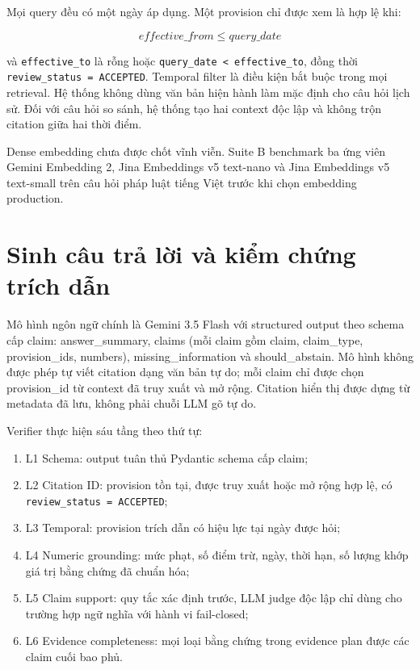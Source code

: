 \documentclass[12pt,a4paper]{article}
\begin{document}
Mọi query đều có một ngày áp dụng. Một provision chỉ được xem là hợp lệ khi:

\[
effective\_from \leq query\_date
\]

và \texttt{effective\_to} là rỗng hoặc \texttt{query\_date < effective\_to}, đồng thời \texttt{review\_status = ACCEPTED}. Temporal filter là điều kiện bắt buộc trong mọi retrieval. Hệ thống không dùng văn bản hiện hành làm mặc định cho câu hỏi lịch sử. Đối với câu hỏi so sánh, hệ thống tạo hai context độc lập và không trộn citation giữa hai thời điểm.

Dense embedding chưa được chốt vĩnh viễn. Suite B benchmark ba ứng viên Gemini Embedding 2, Jina Embeddings v5 text-nano và Jina Embeddings v5 text-small trên câu hỏi pháp luật tiếng Việt trước khi chọn embedding production.

\section{Sinh câu trả lời và kiểm chứng trích dẫn}

Mô hình ngôn ngữ chính là Gemini 3.5 Flash với structured output theo schema cấp claim: answer\_summary, claims (mỗi claim gồm claim, claim\_type, provision\_ids, numbers), missing\_information và should\_abstain. Mô hình không được phép tự viết citation dạng văn bản tự do; mỗi claim chỉ được chọn provision\_id từ context đã truy xuất và mở rộng. Citation hiển thị được dựng từ metadata đã lưu, không phải chuỗi LLM gõ tự do.

Verifier thực hiện sáu tầng theo thứ tự:

\begin{enumerate}
  \item L1 Schema: output tuân thủ Pydantic schema cấp claim;
  \item L2 Citation ID: provision tồn tại, được truy xuất hoặc mở rộng hợp lệ, có \texttt{review\_status = ACCEPTED};
  \item L3 Temporal: provision trích dẫn có hiệu lực tại ngày được hỏi;
  \item L4 Numeric grounding: mức phạt, số điểm trừ, ngày, thời hạn, số lượng khớp giá trị bằng chứng đã chuẩn hóa;
  \item L5 Claim support: quy tắc xác định trước, LLM judge độc lập chỉ dùng cho trường hợp ngữ nghĩa với hành vi fail-closed;
  \item L6 Evidence completeness: mọi loại bằng chứng trong evidence plan được các claim cuối bao phủ.
\end{enumerate}
\end{document}
